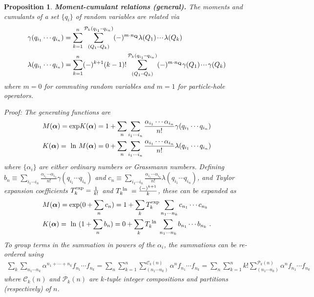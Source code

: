 \documentclass[11pt,fleqn]{article}
\renewcommand{\a}{\alpha}    %
\newcommand{\g}{\gamma}      %
\newcommand{\la}{\lambda}    %
\newcommand{\cd}{\ensuremath{\cdots}}
\newcommand{\etc}{\ensuremath{\mathinner{\mkern-1mu\cdotp\mkern-2mu\cdotp\mkern-2mu\cdotp\mkern-1mu}}}
\newcommand{\bmit}[1]{{\bfseries\itshape\mathversion{bold}#1}}
\newcommand{\mc}[1]{\ensuremath{\mathcal{#1}}}
\newcommand{\bo}[1]{\ensuremath{\mathbf{#1}}}
\newcommand{\fr}[2]{\ensuremath{\dfrac{#1}{#2}}}
\theoremstyle{mystyle}
\newtheorem{pro}{Proposition}[section]
\newcommand{\logbox}{\ensuremath{\text{\makebox[\widthof{exp}][c]{ln}}}}
\newcommand{\expbox}{\ensuremath{\text{\makebox[\widthof{exp}][c]{exp}}}}
\numberwithin{equation}{section}
\begin{document}
\begin{pro}
\label{moment-cumulant-relations-general}
\bmit{Moment-cumulant relations (general).}
\textit{The moments and cumulants of a set $\{q_i\}$ of random variables are related via
\begin{align}
&
  \g(q_{i_1}\cd q_{i_n})
=
  \sum_{k=1}^n
  \sum_{(Q_1\etc Q_k)}^{\mc{P}_k(q_{i_1}\etc q_{i_n})}
  (-)^{m\cdot n_\bo{Q}}
  \la(Q_1)\etc\la(Q_k)
\\
&
  \la(q_{i_1}\cd q_{i_n})
=
  \sum_{k=1}^n
  (-)^{k+1}
  (k-1)!
  \sum_{(Q_1\etc Q_k)}^{\mc{P}_k(q_{i_1}\etc q_{i_n})}
  (-)^{m\cdot n_\bo{Q}}
  \g(Q_1)\etc\g(Q_k)
\end{align}
where $m=0$ for commuting random variables and $m=1$ for particle-hole operators.}
\begin{addmargin}[1em]{0em}
Proof:
The generating functions are
\begin{align*}
&
  M(\bm\a)
=
  \expbox K(\bm\a)
=
  1
+
  \sum_n
  \sum_{i_1\cd i_n}
  \fr{\a_{i_1}\cd \a_{i_n}}{n!}
  \g(q_{i_1}\cd q_{i_n})
\\
&
  K(\bm\a)
=
  \logbox M(\bm\a)
=
  0
+
  \sum_n
  \sum_{i_1\cd i_n}
  \fr{\a_{i_1}\cd \a_{i_n}}{n!}
  \la(q_{i_1}\cd q_{i_n})
\end{align*}
where $\{\a_i\}$ are either ordinary numbers or Grassmann numbers.
Defining
$
  b_n
\equiv
  \sum_{i_1\cd i_n} \frac{\a_{i_1}\cd\a_{i_n}}{n!}\g(q_{i_1}\cd q_{i_n})
$
and
$
  c_n
\equiv
  \sum_{i_1\cd i_n} \frac{\a_{i_1}\cd\a_{i_n}}{n!}\la(q_{i_1}\cd q_{i_n})
$,
and Taylor expansion coefficients $T_k^{\expbox}=\frac{1}{k!}$ and $T_k^{\logbox}=\frac{(-)^{k+1}}{k}$, these can be expanded as
\begin{align*}
&
  M(\bm\a)
=
  \expbox(0+\sum_n c_n)
=
  1
+
  \sum_k
  T_k^{\expbox}
  \sum_{n_1\cd n_k}
  c_{n_1}\cd c_{n_k}
\\
&
  K(\bm\a)
=
  \logbox(1+\sum_n b_n)
=
  0
+
  \sum_k
  T_k^{\logbox}
  \sum_{n_1\cd n_k}
  b_{n_1}\cd b_{n_k}\ .
\end{align*}
To group terms in the summation in powers of the $\a_i$, the summations can be re-ordered using
\begin{align*}
  \sum_k
  \sum_{n_1\cd n_k}
  \a^{n_1+\cd+n_k}
  f_{n_1}\cd f_{n_k}
=
  \sum_n
  \sum_{k=1}^n
  \sum_{(n_1\cd n_k)}^{\mc{C}_k(n)}
  \a^n
  f_{n_1}\cd f_{n_k}
=
  \sum_n
  \sum_{k=1}^n
  k!
  \sum_{(n_1\cd n_k)}^{\mc{P}_k(n)}
  \a^n
  f_{n_1}\cd f_{n_k}
\end{align*}
where $\mc{C}_k(n)$ and $\mc{P}_k(n)$ are $k$-tuple integer compositions and partitions (respectively) of $n$.

\end{addmargin}
\end{pro}
\end{document}
